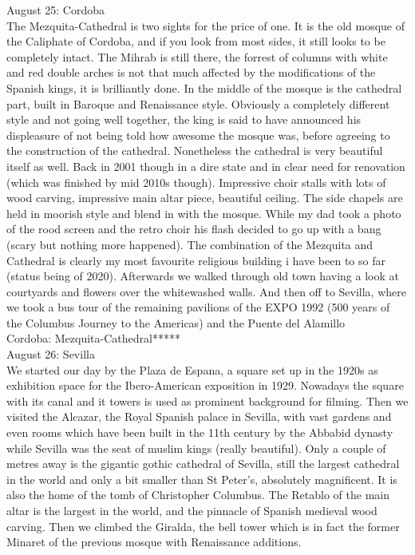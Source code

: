 August 25: Cordoba\\
The Mezquita-Cathedral is two sights for the price of one. It is the old mosque of the Caliphate of Cordoba, and if you look from most sides, it still looks to be completely intact. The Mihrab is still there, the forrest of columns with white and red double arches is not that much affected by the modifications of the Spanish kings, it is brilliantly done. In the middle of the mosque is the cathedral part, built in Baroque and Renaissance style. Obviously a completely different style and not going well together, the king is said to have announced his displeasure of not being told how awesome the mosque was, before agreeing to the construction of the cathedral. Nonetheless the cathedral is very beautiful itself as well. Back in 2001 though in a dire state and in clear need for renovation (which was finished by mid 2010s though). Impressive choir stalls with lots of wood carving, impressive main altar piece, beautiful ceiling. The side chapels are held in moorish style and blend in with the mosque. While my dad took a photo of the rood screen and the retro choir his flash decided to go up with a bang (scary but nothing more happened). The combination of the Mezquita and Cathedral is clearly my most favourite religious building i have been to so far (status being of 2020). Afterwards we walked through old town having a look at courtyards and flowers over the whitewashed walls. And then off to Sevilla, where we took a bus tour of the remaining pavilions of the EXPO 1992 (500 years of the Columbus Journey to the Americas) and the Puente del Alamillo\\ 

Cordoba: Mezquita-Cathedral*****\\

August 26: Sevilla\\
We started our day by the Plaza de Espana, a square set up in the 1920s as exhibition space for the Ibero-American exposition in 1929. Nowadays the square with its canal and it towers is used as prominent background for filming. Then we visited the Alcazar, the Royal Spanish palace in Sevilla, with vast gardens and even rooms which have been built in the 11th century by the Abbabid dynasty while Sevilla was the seat of muslim kings (really beautiful). Only a couple of metres away is the gigantic gothic cathedral of Sevilla, still the largest cathedral in the world and only a bit smaller than St Peter's, absolutely magnificent. It is also the home of the tomb of Christopher Columbus. The Retablo of the main altar is the largest in the world, and the pinnacle of Spanish medieval wood carving. Then we climbed the Giralda, the bell tower which is in fact the former Minaret of the previous mosque with Renaissance additions. \\

